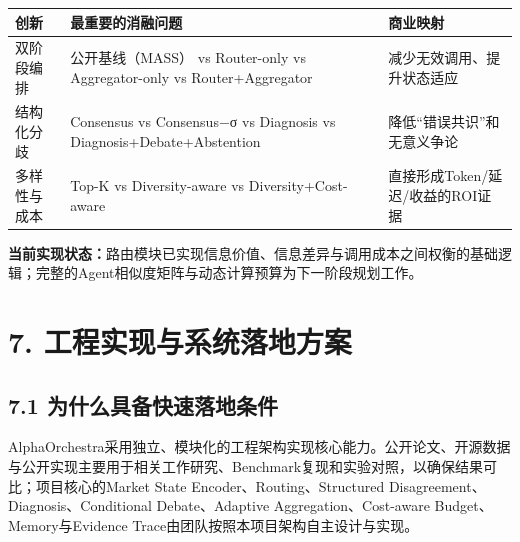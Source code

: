 \documentclass[12pt,a4paper]{ctexart}
\begin{document}
\begin{longtable}[]{@{}
  >{\raggedright\arraybackslash}p{}
  >{\raggedright\arraybackslash}p{}
  >{\raggedright\arraybackslash}p{}@{}}
\toprule\noalign{}
\begin{minipage}[b]{\linewidth}\centering
\textbf{创新}
\end{minipage} & \begin{minipage}[b]{\linewidth}\centering
\textbf{最重要的消融问题}
\end{minipage} & \begin{minipage}[b]{\linewidth}\centering
\textbf{商业映射}
\end{minipage} \\
\midrule\noalign{}
\endhead
\bottomrule\noalign{}
\endlastfoot
双阶段编排 & 公开基线（MASS） vs Router-only vs Aggregator-only vs
Router+Aggregator & 减少无效调用、提升状态适应 \\
结构化分歧 & Consensus vs Consensus−σ vs Diagnosis vs
Diagnosis+Debate+Abstention & 降低``错误共识''和无意义争论 \\
多样性与成本 & Top-K vs Diversity-aware vs Diversity+Cost-aware &
直接形成Token/延迟/收益的ROI证据 \\
\end{longtable}

\textbf{当前实现状态：}路由模块已实现信息价值、信息差异与调用成本之间权衡的基础逻辑；完整的Agent相似度矩阵与动态计算预算为下一阶段规划工作。

\section{\texorpdfstring{\textbf{7.
工程实现与系统落地方案}}{7. 工程实现与系统落地方案}}\label{ux5de5ux7a0bux5b9eux73b0ux4e0eux7cfbux7edfux843dux5730ux65b9ux6848}

\subsection{\texorpdfstring{\textbf{7.1
为什么具备快速落地条件}}{7.1 为什么具备快速落地条件}}\label{ux4e3aux4ec0ux4e48ux5177ux5907ux5febux901fux843dux5730ux6761ux4ef6}

AlphaOrchestra采用独立、模块化的工程架构实现核心能力。公开论文、开源数据与公开实现主要用于相关工作研究、Benchmark复现和实验对照，以确保结果可比；项目核心的Market
State Encoder、Routing、Structured Disagreement、Diagnosis、Conditional
Debate、Adaptive Aggregation、Cost-aware Budget、Memory与Evidence
Trace由团队按照本项目架构自主设计与实现。
\end{document}
